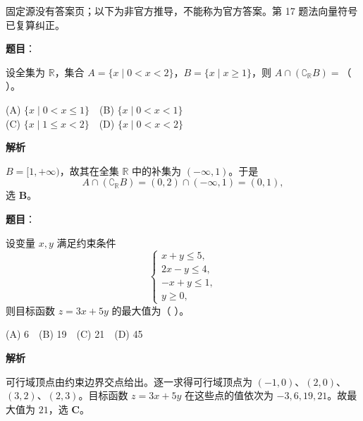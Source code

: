 
\begin{gktip}
固定源没有答案页；以下为非官方推导，不能称为官方答案。第 17 题法向量符号已复算纠正。
\end{gktip}


\begin{answer}

\textbf{题目}：

设全集为 $\mathbb R$，集合 $A=\{x\mid 0<x<2\}$，$B=\{x\mid x\geqslant1\}$，则 $A\cap(\complement_{\mathbb R}B)=$（ ）。

(A) $\{x\mid 0<x\leqslant1\}$　(B) $\{x\mid 0<x<1\}$\\
(C) $\{x\mid 1\leqslant x<2\}$　(D) $\{x\mid 0<x<2\}$

\textbf{解析}

$B=[1,+\infty)$，故其在全集 $\mathbb R$ 中的补集为 $(-\infty,1)$。于是
\nopagebreak[4]
\[A\cap(\complement_{\mathbb R}B)=(0,2)\cap(-\infty,1)=(0,1),\]
选 \textbf{B}。


\end{answer}
\begin{answer}

\textbf{题目}：

设变量 $x,y$ 满足约束条件
\nopagebreak[4]
\[
\begin{cases}
x+y\leqslant5,\\
2x-y\leqslant4,\\
-x+y\leqslant1,\\
y\geqslant0,
\end{cases}
\]
则目标函数 $z=3x+5y$ 的最大值为（ ）。

(A) 6　(B) 19　(C) 21　(D) 45

\textbf{解析}

可行域顶点由约束边界交点给出。逐一求得可行域顶点为 $(-1,0)$、$(2,0)$、$(3,2)$、$(2,3)$。目标函数 $z=3x+5y$ 在这些点的值依次为 $-3,6,19,21$。故最大值为 $21$，选 \textbf{C}。


\end{answer}
